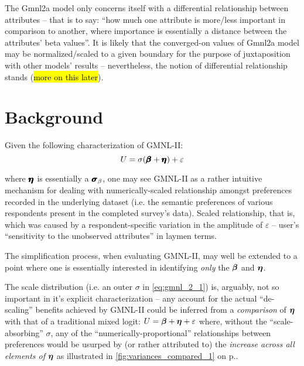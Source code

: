 \documentclass[12pt,a4paper]{article}
\begin{document}
The Gmnl2a model only concerns itself with a differential relationship between attributes  -- that is to say: ``how much one attribute is more/less important in comparison to another, where importance is essentially a distance between the attributes' beta values''. It is likely that the converged-on values of Gmnl2a model may be normalized/scaled to a given boundary for the purpose of juxtaposition with other models' results -- nevertheless, the notion of differential relationship stands (\hl{more on this later}).

\section{Background}

Given the following characterization of GMNL-II:
{ \Large 
\begin{equation}
U=\sigma(\pmb{\hm{\beta}}+\pmb{\hm{\eta}}) + \varepsilon \label{eq:gmnl_2_1}
\end{equation}
}

where \(\pmb{\hm{\eta}}\) is essentially a \(\pmb{\hm{\sigma}}_{\beta}\), one may see GMNL-II as a rather intuitive mechanism for dealing with numerically-scaled relationship amongst preferences recorded in the underlying dataset (i.e. the semantic preferences of various respondents present in the completed survey's data). Scaled relationship, that is, which was caused by a respondent-specific variation in the amplitude of \(\varepsilon\) -- user's ``sensitivity to the unobserved attributes'' in laymen terms.

The simplification process, when evaluating GMNL-II, may well be extended to a point where one is essentially interested in identifying \textit{only} the \(\hm{\beta}\) and \(\hm{\eta}\). 

The scale distribution (i.e. an outer \(\sigma\) in \autoref{eq:gmnl_2_1}) is, arguably, not so important in it's explicit characterization -- any  account for the actual ``de-scaling'' benefits achieved by GMNL-II could be inferred from a \textit{comparison} of  \(\hm{\eta}\) with that of a traditional mixed logit: \(U=\hm{\beta}+\hm{\eta} + \varepsilon\) where, without the ``scale-absorbing'' \(\sigma\), any of the ``numerically-proportional'' relationships between preferences would be usurped by (or rather attributed to) the \textit{increase across all elements of} \(\hm{\eta}\) as illustrated in \autoref{fig:variances_compared_1} on p.\pageref{fig:variances_compared_1}.
\end{document}
